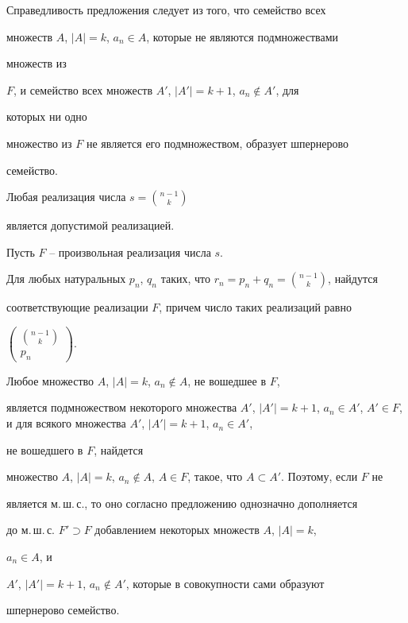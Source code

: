  


Справедливость предложения следует из того, что семейство всех 


множеств $A$, $|A|=k$, $a_n\in A$, которые не являются подмножествами 


множеств из 


$F$, и семейство всех множеств $A'$, $|A'|=k+1$, $a_n\notin A'$, для 


которых ни одно 


множество из $F$ не является его подмножеством, образует шпернерово 


семейство. 


 


 


\begin{thm} 


Любая реализация числа $s=\binom{n-1}{k}$ 


является допустимой реализацией. 


\end{thm} 


 


\begin{pf} 


Пусть $F$ -- произвольная реализация числа $s$. 


Для любых натуральных $p_n$, $q_n$ таких, что $r_n=p_n+q_n= 


\binom{n-1}{k}$, найдутся 


соответствующие реализации $F$, причем число таких реализаций равно 


$\begin{pmatrix} \binom{n-1}{k} \\ p_n \end{pmatrix}$. 


Любое множество $A$, $|A|=k$, $a_n\notin A$, не вошедшее в $F$, 


является подмножеством некоторого множества $A'$, $|A'|=k+1$, $a_n\in 


A'$, $A'\in F$, и для всякого множества $A'$, $|A'|=k+1$, $a_n\in A'$,


не вошедшего в $F$, найдется 


множество $A$, $|A|=k$, $a_n\notin A$, $A\in F$, такое, что $A\subset 


A'$. Поэтому, если $F$ не 


является м.\,ш.\,с., то оно согласно предложению однозначно дополняется 


до м.\,ш.\,с. $F'\supset F$ добавлением некоторых множеств $A$, $|A|=k$, 


$a_n\in A$, и 


$A'$, $|A'|=k+1$, $a_n\notin A'$, которые в совокупности сами образуют 


шпернерово семейство. 


\end{pf} 


